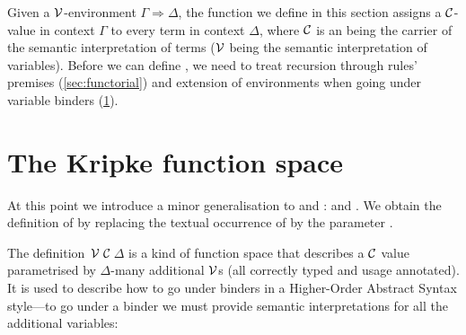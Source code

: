 Given a $\mathcal V$-environment $\Gamma \Rightarrow \Delta$, the function
 we define in this section assigns a
$\mathcal C$-value in context $\Gamma$ to every term in context $\Delta$,
where $\mathcal C$ is an  being the carrier of the
semantic interpretation of terms ($\mathcal V$ being the semantic
interpretation of variables). Before we can define
, we need to treat recursion through rules'
premises (\cref{sec:functorial}) and extension of environments when
going under variable binders (\cref{sec:kripke}).




\section{The Kripke function space}\label{sec:kripke}

At this point we introduce a minor generalisation to
 and :
\AgdaSpace{} and
\AgdaSpace{}.  We obtain the
definition of \AgdaSpace{} by
replacing the textual occurrence of  by the parameter
.

The definition \,$\mathcal V$\,$\mathcal C$\,$\Delta$ is a kind
of function space that describes a $\mathcal C$ value parametrised by
$\Delta$-many additional $\mathcal V$s (all correctly typed and usage
annotated). It is used to describe how to go under binders in a
Higher-Order Abstract Syntax style---to go under a binder we must
provide semantic interpretations for all the additional variables:

